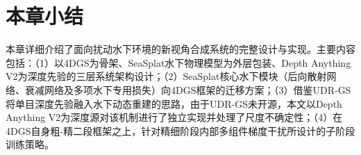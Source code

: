 \section{本章小结}

本章详细介绍了面向扰动水下环境的新视角合成系统的完整设计与实现。主要内容包括：（1）以4DGS为骨架、SeaSplat水下物理模型为外层包装、Depth Anything V2为深度先验的三层系统架构设计；（2）SeaSplat核心水下模块（后向散射网络、衰减网络及多项水下专用损失）向4DGS框架的迁移方案；（3）借鉴UDR-GS将单目深度先验融入水下动态重建的思路，由于UDR-GS未开源，本文以Depth Anything V2为深度源对该机制进行了独立实现并处理了尺度不确定性；（4）在4DGS自身粗-精二段框架之上，针对精细阶段内部多组件梯度干扰所设计的子阶段训练策略。
